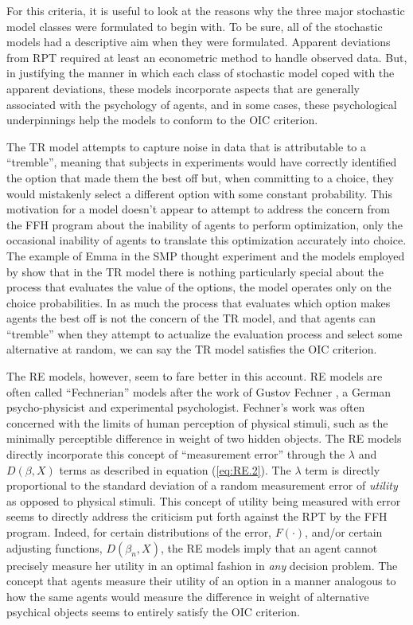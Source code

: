 For this criteria, it is useful to look at the reasons why the three major stochastic model classes were formulated to begin with.
To be sure, all of the stochastic models had a descriptive aim when they were formulated.
Apparent deviations from RPT required at least an econometric method to handle observed data.
But, in justifying the manner in which each class of stochastic model coped with the apparent deviations, these models incorporate aspects that are generally associated with the psychology of agents, and in some cases, these psychological underpinnings help the models to conform to the OIC criterion.

The TR model attempts to capture noise in data that is attributable to a \enquote{tremble}, meaning that subjects in experiments would have correctly identified the option that made them the best off but, when committing to a choice, they would mistakenly select a different option with some constant probability.
This motivation for a model doesn't appear to attempt to address the concern from the FFH program about the inability of agents to perform optimization, only the occasional inability of agents to translate this optimization accurately into choice.
The example of Emma in the SMP thought experiment and the models employed by \textcite{Loomes2002} show that in the TR model there is nothing particularly special about the process that evaluates the value of the options, the model operates only on the choice probabilities.
In as much the process that evaluates which option makes agents the best off is not the concern of the TR model, and that agents can \enquote{tremble} when they attempt to actualize the evaluation process and select some alternative at random, we can say the TR model satisfies the OIC criterion.

The RE models, however, seem to fare better in this account.
RE models are often called \enquote{Fechnerian} models after the work of Gustov Fechner \parencite{Fechner1966a}, a German psycho-physicist and experimental psychologist.
Fechner's work was often concerned with the limits of human perception of physical stimuli, such as the minimally perceptible difference in weight of two hidden objects.
The RE models directly incorporate this concept of \enquote{measurement error} through the $\lambda$ and $D(\beta,X)$ terms as described in equation (\ref{eq:RE.2}).
The $\lambda$ term is directly proportional to the standard deviation of a random measurement error of \textit{utility} as opposed to physical stimuli.
This concept of utility being measured with error seems to directly address the criticism put forth against the RPT by the FFH program.
Indeed, for certain distributions of the error, $F(\cdot)$, and/or certain adjusting functions, $D(\beta_n,X)$, the RE models imply that an agent cannot precisely measure her utility in an optimal fashion in \textit{any} decision problem.
The concept that agents measure their utility of an option in a manner analogous to how the same agents would measure the difference in weight of alternative psychical objects seems to entirely satisfy the OIC criterion.

